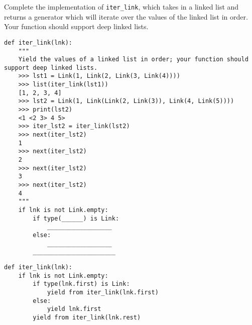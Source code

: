 \begin{blocksection}
\question Complete the implementation of \texttt{iter_link}, which takes in a linked list and returns a generator which will iterate over the values of the linked list in order. Your function should support deep linked lists.


\begin{lstlisting}
def iter_link(lnk):
	""" 
	Yield the values of a linked list in order; your function should support deep linked lists.
	>>> lst1 = Link(1, Link(2, Link(3, Link(4))))
	>>> list(iter_link(lst1))
	[1, 2, 3, 4]
	>>> lst2 = Link(1, Link(Link(2, Link(3)), Link(4, Link(5))))
	>>> print(lst2)
	<1 <2 3> 4 5>
	>>> iter_lst2 = iter_link(lst2)
	>>> next(iter_lst2)
	1
	>>> next(iter_lst2)
	2
	>>> next(iter_lst2) 
	3
	>>> next(iter_lst2)
	4
	"""
	if lnk is not Link.empty:
		if type(______) is Link:
			__________________
		else:
			__________________
		_______________________

\end{lstlisting}

\begin{solution}[0.7in]
\begin{lstlisting}
def iter_link(lnk):
	if lnk is not Link.empty:
		if type(lnk.first) is Link:
			yield from iter_link(lnk.first)
		else:
			yield lnk.first
		yield from iter_link(lnk.rest)

\end{lstlisting}
\end{solution}
\end{blocksection}
